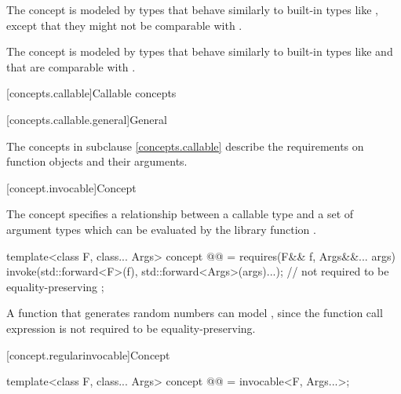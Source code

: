 \begin{itemdescr}
\pnum
\begin{note}
The  concept is modeled by types that behave similarly
to built-in types like , except that they might not
be comparable with \tcode{==}.
\end{note}

\pnum
\begin{note}
The  concept is modeled by types that behave similarly to
built-in types like  and that are comparable with
\tcode{==}.
\end{note}
\end{itemdescr}

[concepts.callable]{Callable concepts}

[concepts.callable.general]{General}

\pnum
The concepts in subclause \ref{concepts.callable} describe the requirements on function
objects and their arguments.

[concept.invocable]{Concept }

\pnum
The  concept specifies a relationship between a callable
type  and a set of argument types  which
can be evaluated by the library function .

\begin{itemdecl}
template<class F, class... Args>
  concept @@ = requires(F&& f, Args&&... args) {
    invoke(std::forward<F>(f), std::forward<Args>(args)...); // not required to be equality-preserving
  };
\end{itemdecl}

\begin{itemdescr}
\pnum
\begin{example}
A function that generates random numbers can model ,
since the  function call expression is not required to be
equality-preserving.
\end{example}
\end{itemdescr}

[concept.regularinvocable]{Concept }

\begin{itemdecl}
template<class F, class... Args>
  concept @@ = invocable<F, Args...>;
\end{itemdecl}

